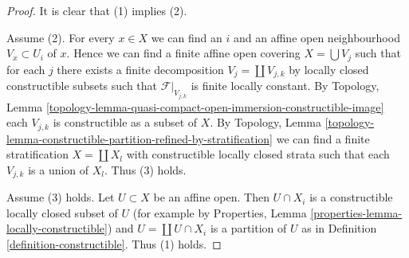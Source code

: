 \documentclass[10pt,a4paper]{amsart}
\theoremstyle{plain}
\theoremstyle{definition}
\theoremstyle{remark}
\numberwithin{equation}{subsection}
\begin{document}
\begin{proof}
It is clear that (1) implies (2).

\medskip\noindent
Assume (2). For every $x \in X$ we can find an $i$ and an affine open
neighbourhood $V_x \subset U_i$ of $x$. Hence we can find a finite
affine open covering $X = \bigcup V_j$ such that for each $j$ there
exists a finite decomposition $V_j = \coprod V_{j, k}$ by locally closed
constructible subsets such that $\mathcal{F}|_{V_{j, k}}$ is finite
locally constant. By Topology, Lemma
\ref{topology-lemma-quasi-compact-open-immersion-constructible-image}
each $V_{j, k}$ is constructible as a subset of $X$.
By Topology, Lemma
\ref{topology-lemma-constructible-partition-refined-by-stratification}
we can find a finite stratification $X = \coprod X_l$ with constructible
locally closed strata such that each
$V_{j, k}$ is a union of $X_l$. Thus (3) holds.

\medskip\noindent
Assume (3) holds. Let $U \subset X$ be an affine open.
Then $U \cap X_i$ is a constructible locally closed subset of $U$
(for example by Properties, Lemma \ref{properties-lemma-locally-constructible})
and $U = \coprod U \cap X_i$ is a partition of $U$ as in
Definition \ref{definition-constructible}. Thus (1) holds.
\end{proof}
\end{document}
